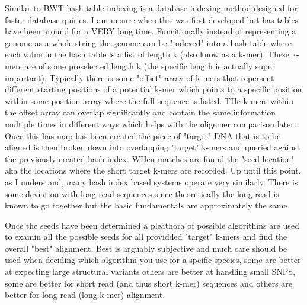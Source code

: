 \documentclass{article}
\begin{document}
\begin{enumerate}
        Similar to BWT hash table indexing is a database indexing method designed for faster database quiries.   I am unsure when this was first developed but has tables have been around for a VERY long time.   Funcitionally instead of representing a genome as a whole string the genome can be "indexed" into a hash table where each value in the hash table is a list of length k (also know as a k-mer).  These k-mers are of some preselected length k (the specific length is actually super important).  Typically there is some "offset" array of k-mers that repersent different starting positions of a potential k-mer which points to a specific position within some position array where the full sequence is listed.  THe k-mers within the offset array can overlap significantly and contain the same information multiple times in different ways which helps with the oligemer comparison later.  Once this has map has been created the piece of "target" DNA that is to be aligned is then broken down into overlapping "target" k-mers and queried against the previously created hash index.  WHen matches are found the "seed location" aka the locations where the short target k-mers are recorded.  Up until this point, as I understand, many hash index based systems operate very similarly.  There is some deviation with long read sequences since theoretically the long read is known to go together but the basic fundamentals are approximately the same.

        Once the seeds have been determined a pleathora of possible algorithms are used to examin all the possible seeds for all providded "target" k-mers and find the overall "best" alignment.  Best is arguably subjective and much care should be used when deciding which algorithm you use for a spcific species, some are better at expecting large structural variants others are better at handling small SNPS, some are better for short read (and thus short k-mer) sequences and others are better for long read (long k-mer) alignment.


\end{enumerate}
\end{document}
